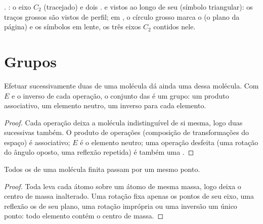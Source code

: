 \begin{omfigure}
{\small {}. : o eixo $C_2$ (tracejado) e dois .  e  vistos ao longo de seu 
(símbolo triangular): os traços grossos são  vistos de perfil;
em , o círculo grosso marca o  (o plano da
página) e os símbolos em lente, os três eixos $C_2$ contidos nele.}
\end{omfigure}

\section{Grupos}

\begin{proposition}\label{prop:b3:point-groups:closure}
Efetuar sucessivamente duas  de uma molécula dá ainda
uma  dessa molécula. Com $E$ e o inverso de cada
operação, o conjunto das  é um grupo: um produto
associativo, um elemento neutro, um inverso para cada elemento.
\end{proposition}

\begin{proof}
Cada operação deixa a molécula indistinguível de si mesma, logo duas
sucessivas também. O produto de operações (composição de transformações do
espaço) é associativo; $E$ é o elemento neutro; uma operação desfeita (uma
rotação do ângulo oposto, uma reflexão repetida) é também uma .
\end{proof}

\begin{proposition}\label{prop:b3:point-groups:fixed-point}
Todos os  de uma molécula finita passam por um mesmo ponto.
\end{proposition}

\begin{proof}
Toda  leva cada átomo sobre um átomo de mesma massa,
logo deixa o centro de massa inalterado. Uma rotação fixa apenas os pontos de
seu eixo, uma reflexão os de seu plano, uma rotação imprópria ou uma inversão
um único ponto: todo elemento contém o centro de massa.
\end{proof}

